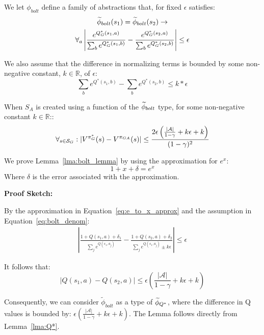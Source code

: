 We let $\phi_{bolt}$ define a family of abstractions that, for fixed $\epsilon$ satisfies:
\begin{multline}
\widetilde \phi_{bolt}(s_1) = \widetilde \phi_{bolt}(s_2) \rightarrow \\
\forall_{a} \left|\frac{e^{Q_G^*(s_1,a)}}{\sum_b e^{Q_G^*(s_1,b)}} - \frac{e^{Q_G^*(s_2,a)}}{\sum_b e^{Q_G^*(s_2,b)}}\right| \leq \epsilon
\label{eq:phi_bolt}
\end{multline}
\edefn

We also assume that the difference in normalizing terms is bounded by some non-negative constant, $k\in \mathbb{R}$, of $\epsilon$:
\begin{equation}
\sum_b e^{Q^*(s_1,b)} - \sum_b e^{Q^*(s_2,b)} \leq k*\epsilon
\label{eq:bolt_denom}
\end{equation}

\begin{lma} When $S_A$ is created using a function of the $\widetilde \phi_{bolt}$ type, for some non-negative constant $k \in \mathbb{R}$::
\begin{equation}
\forall_{s \in \mathcal{S}_G} : | V^{\pi^*_G}(s) - V^{\pi_{GA}}(s) | \leq \frac{2\epsilon\left(\frac{|\mathcal{A}|}{1-\gamma} + k\epsilon + k\right)}{(1-\gamma)^2}
\end{equation}
\label{lma:bolt_lemma}
\end{lma}

We prove Lemma~\ref{lma:bolt_lemma} by using the approximation for $e^x$:
\begin{equation}
1 + x + \delta = e^x
\label{eq:e_to_x_approx}
\end{equation}
Where $\delta$ is the error associated with the approximation.

{\bf Proof Sketch:}

By the approximation in Equation~\ref{eq:e_to_x_approx} and the assumption in Equation~\ref{eq:bolt_denom}:
\begin{align*}
|\frac{1 + Q(s_1,a) + \delta_1}{\sum_j e^{Q(s_1,a_j)}} - \frac{1 + Q(s_2,a) + \delta_2}{\sum_j e^{Q(s_1,a_j)} \pm k\epsilon}| \leq \epsilon
\end{align*}

It follows that:
\begin{equation}
|Q(s_1,a) - Q(s_2,a)| \leq \epsilon \left(\frac{|\mathcal{A}|}{1-\gamma} + k\epsilon + k \right)
\label{eq:bolt_qs}
\end{equation}

Consequently, we can consider $\widetilde{\phi}_{bolt}$ as a type of $\widetilde \phi_{Q^*}$, where the difference in Q values is bounded by: $\epsilon \left(\frac{|\mathcal{A}|}{1-\gamma} + k\epsilon + k \right)$. The Lemma follows directly from Lemma~\ref{lma:Q*}.


